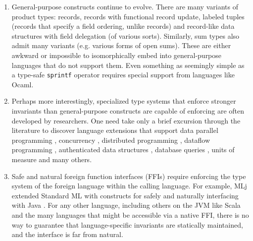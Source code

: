 \begin{enumerate}
\item General-purpose constructs continue to evolve. There are many  variants of product types: records, records with functional record update, labeled tuples (records that specify a field ordering, unlike records) and record-like data structures with field delegation (of various sorts). Similarly, sum types also admit many variants (e.g. various forms of open sums). These are  either awkward or impossible to isomorphically embed into general-purpose languages that do not support them. Even something as seemingly simple as a type-safe \verb|sprintf| operator requires special support from languages like Ocaml.
\item Perhaps more interestingly, specialized type systems that enforce stronger invariants than general-purpose constructs are capable of enforcing are often developed by researchers. One need take only a brief  excursion through the literature to discover language extensions that support data parallel programming \cite{chakravarty2007data}, concurrency \cite{reppy1993concurrent}, distributed programming \cite{Murphy:2007:TDP:1793574.1793585}, dataflow programming \cite{mandel2005reactiveml}, authenticated data structures \cite{Miller:2014:ADS:2535838.2535851}, database queries \cite{Ohori:2011:MSM:2034773.2034815},  units of measure \cite{conf/cefp/Kennedy09} and many others.%
\item Safe and natural foreign function interfaces (FFIs) require enforcing the type system of the foreign language within the calling language. %
For example, MLj extended Standard ML with constructs for safely and naturally interfacing with Java \cite{benton1999interlanguage}. For any other language, including  others on the JVM like Scala and the many languages that might be accessible via a native FFI, there is no way to guarantee that language-specific invariants are statically maintained, and the interface is far from natural.
\end{enumerate}

